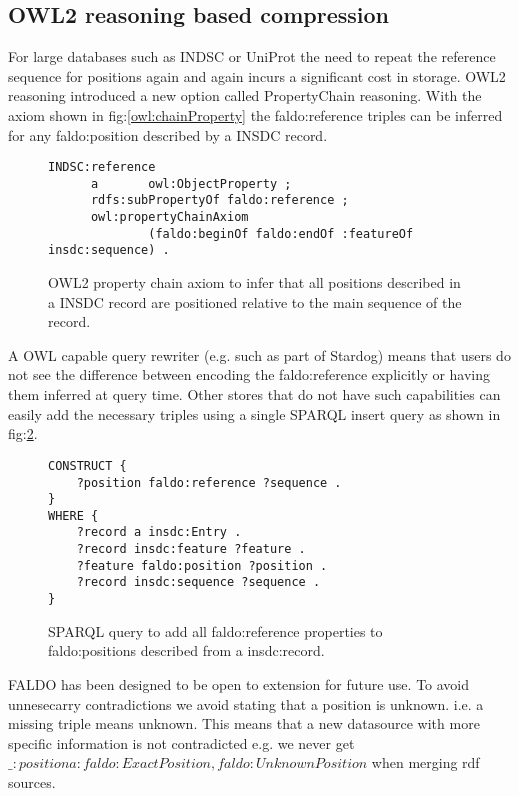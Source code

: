 \subsection*{OWL2 reasoning based compression}
For large databases such as INDSC or UniProt the need to repeat the reference sequence for positions again and again incurs a significant cost in storage.
OWL2 reasoning introduced a new option called PropertyChain reasoning. 
With the axiom shown in fig:\ref{owl:chainProperty} the faldo:reference triples can be inferred for any faldo:position described by a INSDC record.
\begin{figure}
\begin{verbatim}
INDSC:reference
      a       owl:ObjectProperty ;
      rdfs:subPropertyOf faldo:reference ;
      owl:propertyChainAxiom
              (faldo:beginOf faldo:endOf :featureOf insdc:sequence) .
\end{verbatim}
\caption{OWL2 property chain axiom to infer that all positions described in a INSDC record are positioned relative to the main sequence of the record.}
\label{owl:chainProprty}
\end{figure}
A OWL capable query rewriter (e.g. such as part of Stardog) means that users do not see the difference between encoding the faldo:reference explicitly or having them inferred at query time.
Other stores that do not have such capabilities can easily add the necessary triples using a single SPARQL insert query as shown in fig:\ref{sparql:chainProperty}.
\begin{figure}
\begin{verbatim}
CONSTRUCT {
    ?position faldo:reference ?sequence .
}
WHERE {
    ?record a insdc:Entry .
    ?record insdc:feature ?feature .
    ?feature faldo:position ?position .
    ?record insdc:sequence ?sequence .
}
\end{verbatim}
\caption{SPARQL query to add all faldo:reference properties to faldo:positions described from a insdc:record.}
\label{sparql:chainProperty}
\end{figure}

FALDO has been designed to be open to extension for future use.
To avoid unnesecarry contradictions we avoid stating that a position is unknown.
i.e. a missing triple means unknown. 
This means that a new datasource with more specific information is not contradicted e.g.
we never get $\_:position a :faldo:ExactPosition,faldo:UnknownPosition$ when merging rdf sources.


